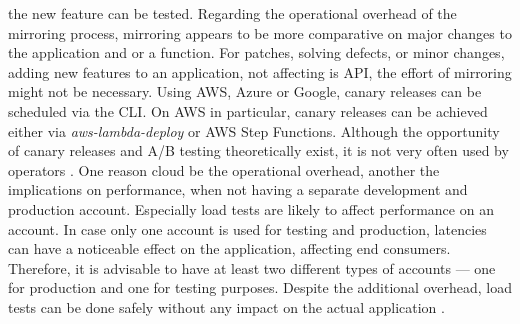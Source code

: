 \documentclass[a4paper,11pt, pagesize]{scrartcl}
\begin{document}
\begin{spacing}{1.2}
the new feature can be tested. Regarding the operational overhead of the mirroring process, mirroring appears to be more comparative on major changes to the application and or a function. For patches, solving defects, or minor changes, adding new features to an application, not affecting is API, the effort of mirroring might not be necessary. Using AWS, Azure or Google, canary releases can be scheduled via the CLI. On AWS in particular, canary releases can be achieved either via \textit{aws-lambda-deploy} or AWS Step Functions. Although the opportunity of canary releases and A/B testing theoretically exist, it is not very often used by operators \cite{leitner2019mixed}. One reason cloud be the operational overhead, another the implications on performance, when not having a separate development and production account. Especially load tests are likely to affect performance on an account. In case only one account is used for testing and production, latencies can have a noticeable effect on the application, affecting end consumers. Therefore, it is advisable to have at least two different types of accounts — one for production and one for testing purposes. Despite the additional overhead, load tests can be done safely without any impact on the actual application \cite{leitner2019mixed}.

\end{spacing}
\end{document}
